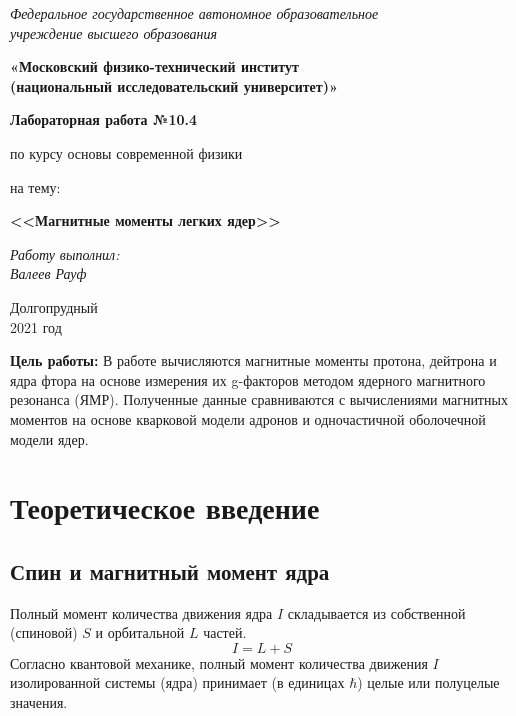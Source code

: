 \documentclass[a4paper, 12pt]{article}%
\begin{document}
		\begin{titlepage}
			\begin{center}
				\textit{Федеральное государственное автономное образовательное\\ учреждение высшего образования }
				\vspace{0.5ex}
				
				\textbf{«Московский физико-технический институт\\ (национальный исследовательский университет)»}
			\end{center}
			\vspace{10ex}
			\begin{center}
				\vspace{13ex}
				\textbf{Лабораторная работа №10.4}
				\vspace{1ex}
				
				по курсу основы современной физики
				
				
				на тему:
				
				\textbf{\large{<<Магнитные моменты легких ядер>>}}
				
				\vspace{30ex}
				\begin{flushright}
					\noindent
					\textit{Работу выполнил:}
					\\
					\textit{Валеев Рауф
					}						 
				\end{flushright}
				\vfill
				Долгопрудный \\2021 год
			\end{center}
		\end{titlepage}
	
				\newpage	

	\pagestyle{fancy}

\textbf{Цель работы:} В работе вычисляются магнитные моменты протона, дейтрона и ядра фтора на основе измерения их g-факторов методом ядерного магнитного резонанса (ЯМР). Полученные данные сравниваются с вычислениями магнитных моментов на основе кварковой модели адронов и одночастичной оболочечной модели ядер.

\section{Теоретическое введение}

\subsection{Спин и магнитный момент ядра}
Полный момент количества движения ядра $I$ 	складывается из собственной (спиновой) $S$ и орбитальной $L$ частей.
\[I = L + S\]
Согласно квантовой механике, полный момент количества движения $I$ изолированной системы (ядра) принимает (в единицах $\hbar$) целые или полуцелые значения.
\end{document}
